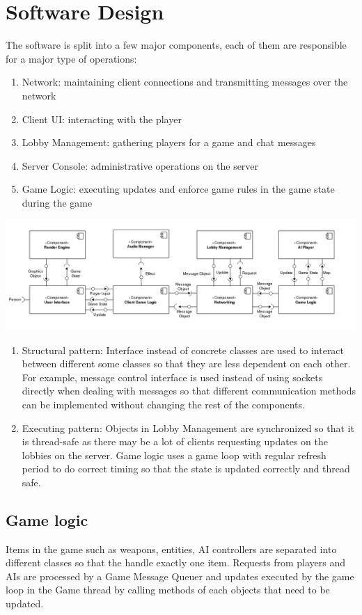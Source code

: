 \documentclass[12pt]{article}
\begin{document}
\section{Software Design}
The software is split into a few major components, each of them are responsible for a major type of operations:
\begin{enumerate}
\item Network: maintaining client connections and transmitting messages over the network
\item Client UI: interacting with the player
\item Lobby Management: gathering players for a game and chat messages
\item Server Console: administrative operations on the server
\item Game Logic: executing updates and enforce game rules in the game state during the game
\end{enumerate}
{\includegraphics[width=550px,height=\textheight,keepaspectratio]{component_diagram}}

\begin{enumerate}
\item Structural pattern: Interface instead of concrete classes are used to interact between different some classes so that they are less dependent on each other. For example, message control interface is used instead of using sockets directly when dealing with messages so that different communication methods can be implemented without changing the rest of the components.
\item Executing pattern: Objects in Lobby Management are synchronized so that it is thread-safe as there may be a lot of clients requesting updates on the lobbies on the server. Game logic uses a game loop with regular refresh period to do correct timing so that the state is updated correctly and thread safe.
\end{enumerate}
\subsection{Game logic} 
Items in the game such as weapons, entities, AI controllers are separated into different classes so that the handle exactly one item. Requests from players and AIs are processed by a Game Message Queuer and updates executed by the game loop in the Game thread by calling methods of each objects that need to be updated.
\end{document}

